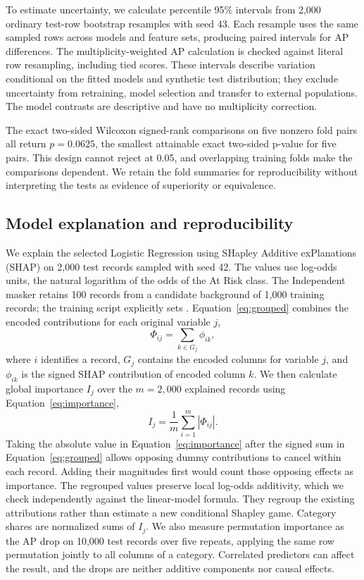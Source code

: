 \documentclass[runningheads]{llncs}
\begin{document}
To estimate uncertainty, we calculate percentile 95\% intervals from 2,000 ordinary test-row bootstrap resamples with seed 43. Each resample uses the same sampled rows across models and feature sets, producing paired intervals for AP differences. The multiplicity-weighted AP calculation is checked against literal row resampling, including tied scores. These intervals describe variation conditional on the fitted models and synthetic test distribution; they exclude uncertainty from retraining, model selection and transfer to external populations. The model contrasts are descriptive and have no multiplicity correction.

The exact two-sided Wilcoxon signed-rank comparisons on five nonzero fold pairs all return $p=0.0625$, the smallest attainable exact two-sided p-value for five pairs. This design cannot reject at 0.05, and overlapping training folds make the comparisons dependent. We retain the fold summaries for reproducibility without interpreting the tests as evidence of superiority or equivalence.

\subsection{Model explanation and reproducibility}
We explain the selected Logistic Regression using SHapley Additive exPlanations (SHAP) \cite{shap} on 2,000 test records sampled with seed 42. The values use log-odds units, the natural logarithm of the odds of the At Risk class. The Independent masker retains 100 records from a candidate background of 1,000 training records; the training script explicitly sets . Equation~\eqref{eq:grouped} combines the encoded contributions for each original variable $j$,
\begin{equation}\Phi_{ij}=\sum_{k\in G_j}\phi_{ik},\label{eq:grouped}\end{equation}
where $i$ identifies a record, $G_j$ contains the encoded columns for variable $j$, and $\phi_{ik}$ is the signed SHAP contribution of encoded column $k$. We then calculate global importance $I_j$ over the $m=2{,}000$ explained records using Equation~\eqref{eq:importance},
\begin{equation}I_j=\frac{1}{m}\sum_{i=1}^{m}|\Phi_{ij}|.\label{eq:importance}\end{equation}
Taking the absolute value in Equation~\eqref{eq:importance} after the signed sum in Equation~\eqref{eq:grouped} allows opposing dummy contributions to cancel within each record. Adding their magnitudes first would count those opposing effects as importance. The regrouped values preserve local log-odds additivity, which we check independently against the linear-model formula. They regroup the existing attributions rather than estimate a new conditional Shapley game. Category shares are normalized sums of $I_j$. We also measure permutation importance as the AP drop on 10,000 test records over five repeats, applying the same row permutation jointly to all columns of a category. Correlated predictors can affect the result, and the drops are neither additive components nor causal effects.
\end{document}
